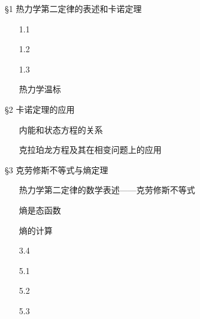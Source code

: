 \documentclass[CJK]{beamer}
\begin{document}
\begin{frame}
\bch
\S{1} 热力学第二定律的表述和卡诺定理
\begin{itemize}
\item[1.1]{}
\item[1.2]{}
\item[1.3]{}
\item[\blacktext{1.4}]{热力学温标}
\item[\greentext{1.5}]{}
\end{itemize}

\S{2} 卡诺定理的应用
\begin{itemize}
\item[\blacktext{2.1}]{内能和状态方程的关系}
\item[\blacktext{2.2}]{克拉珀龙方程及其在相变问题上的应用}
\end{itemize}
\ech
\end{frame}

\begin{frame}
\bch
\S{3} 克劳修斯不等式与熵定理
\begin{itemize}
\item[\blacktext{3.1}]{热力学第二定律的数学表述——克劳修斯不等式}
\item[\blacktext{3.2}]{熵是态函数}
\item[\blacktext{3.3}]{熵的计算}
\item[3.4]{}
\item[\cyantext{3.5}]{}
\end{itemize}



\ech
\end{frame}

\begin{frame}
\bch

\begin{itemize}
\item[5.1]{}
\item[5.2]{}
\item[5.3]{}
\item[\greentext{5.4}]{}
\item[\greentext{5.5}]{}
\item[\greentext{5.6}]{}
\end{itemize}


\ech
\end{frame}
\end{document}
